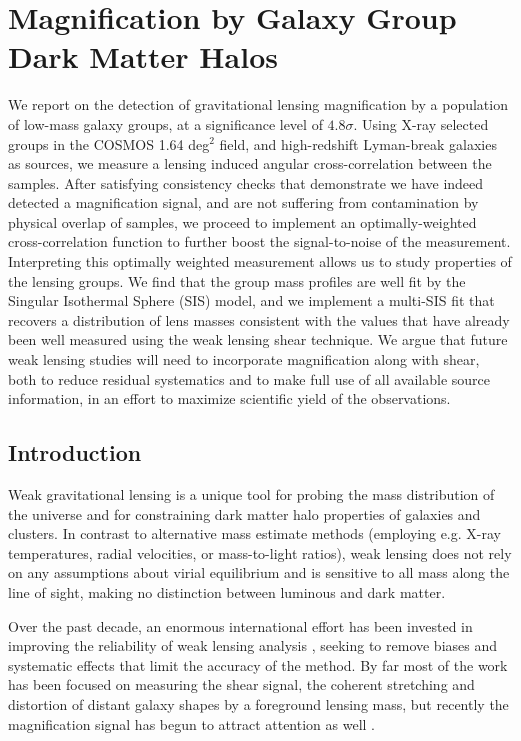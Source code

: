 
\chapter{Magnification by Galaxy Group Dark Matter Halos}


We report on the detection of gravitational lensing magnification by a population of low-mass galaxy groups, at a significance level of $4.8 \sigma$.  Using X-ray selected groups in the COSMOS 1.64 deg$^2$ field, and high-redshift Lyman-break galaxies as sources, we measure a lensing induced angular cross-correlation between the samples.  After satisfying consistency checks that demonstrate we have indeed detected a magnification signal, and are not suffering from contamination by physical overlap of samples, we proceed to implement an optimally-weighted cross-correlation function to further boost the signal-to-noise of the measurement. Interpreting this optimally weighted measurement allows us to study properties of the lensing groups.  We find that the group mass profiles are well fit by the Singular Isothermal Sphere (SIS) model, and we implement a multi-SIS fit that recovers a distribution of lens masses consistent with the values that have already been well measured using the weak lensing shear technique.  We argue that future weak lensing studies will need to incorporate magnification along with shear, both to reduce residual systematics and to make full use of all available source information, in an effort to maximize scientific yield of the observations.


\section{Introduction}
Weak gravitational lensing is a unique tool for probing the mass distribution of the universe and for constraining dark matter halo properties of galaxies and clusters.  In contrast to alternative mass estimate methods (employing e.g. X-ray temperatures, radial velocities, or mass-to-light ratios), weak lensing does not rely on any assumptions about virial equilibrium and is sensitive to all mass along the line of sight, making no distinction between luminous and dark matter.  

Over the past decade, an enormous international effort has been invested in improving the reliability of weak lensing analysis \citep{step1, step2, great08, great10}, seeking to remove biases and systematic effects that limit the accuracy of the method.  By far most of the work has been focused on measuring the shear signal, the coherent stretching and distortion of distant galaxy shapes by a foreground lensing mass, but recently the magnification signal has begun to attract attention as well \citep{Scranton05, Hildebrandt09b, Hildebrandt11, LHJM10, Umetsu11}.  


